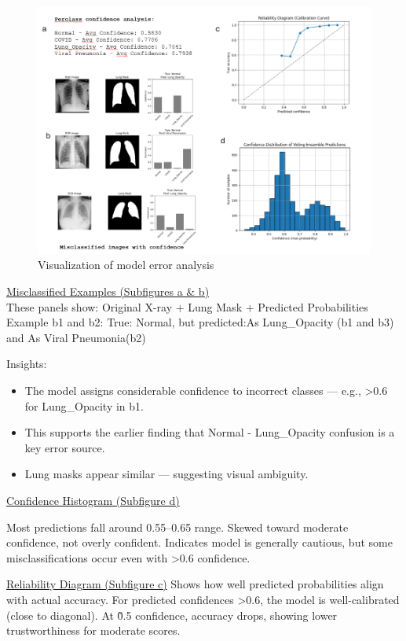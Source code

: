 \documentclass{article}
\begin{document}
\begin{figure}%
    \centering
    \includegraphics[width=1.0\linewidth]{figures_report_3/error_analysis.png}
    \caption{Visualization of model error analysis}
    \label{fig:error_analysis}
\end{figure}

\underline{Misclassified Examples (Subfigures a \& b)}\\

These panels show:
Original X-ray + Lung Mask + Predicted Probabilities
Example b1 and b2:
True: Normal, but predicted:As Lung\_Opacity (b1 and b3) and As Viral Pneumonia(b2)

Insights:
\begin{itemize}
    \item The model assigns considerable confidence to incorrect classes — e.g., >0.6 for Lung\_Opacity in b1.
    \item This supports the earlier finding that Normal - Lung\_Opacity confusion is a key error source.
    \item Lung masks appear similar — suggesting visual ambiguity.
\end{itemize}

\underline{Confidence Histogram (Subfigure d)}

Most predictions fall around 0.55–0.65 range.
Skewed toward moderate confidence, not overly confident.
Indicates model is generally cautious, but some misclassifications occur even with >0.6 confidence.

\underline{Reliability Diagram (Subfigure c)}
Shows how well predicted probabilities align with actual accuracy.
For predicted confidences >0.6, the model is well-calibrated (close to diagonal).
At \~0.5 confidence, accuracy drops, showing lower trustworthiness for moderate scores.
\end{document}
